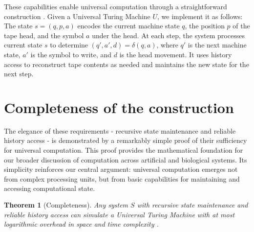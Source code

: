 \documentclass[12pt]{article}
\newtheorem{theorem}{Theorem}
\begin{document}
These capabilities enable universal computation through a straightforward construction \cite{deutsch1995universality,bennett1989time}. Given a Universal Turing Machine $U$, we implement it as follows: The state $s = (q, p, a)$ encodes the current machine state $q$, the position $p$ of the tape head, and the symbol $a$ under the head. At each step, the system processes current state $s$ to determine $(q', a', d) = \delta(q, a)$, where $q'$ is the next machine state, $a'$ is the symbol to write, and $d$ is the head movement. It uses history access to reconstruct tape contents as needed and maintains the new state for the next step.

\section{Completeness of the construction}

The elegance of these requirements - recursive state maintenance and reliable history access - is demonstrated by a remarkably simple proof of their sufficiency for universal computation. This proof provides the mathematical foundation for our broader discussion of computation across artificial and biological systems. Its simplicity reinforces our central argument: universal computation emerges not from complex processing units, but from basic capabilities for maintaining and accessing computational state.

\begin{theorem}[Completeness]
Any system $S$ with recursive state maintenance and reliable history access can simulate a Universal Turing Machine with at most logarithmic overhead in space and time complexity \cite{boyle2024memory,liskiewicz1994complexity}.
\end{theorem}
\end{document}
